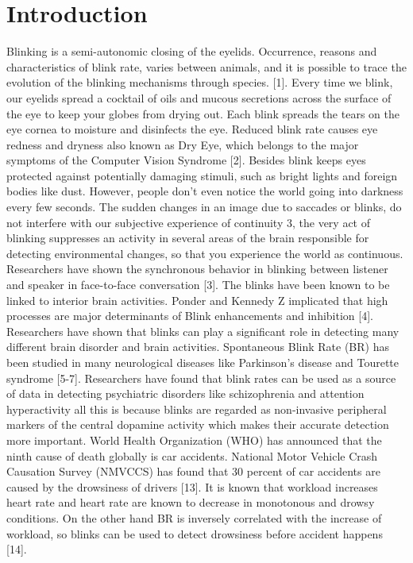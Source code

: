 \documentclass[10pt,letterpaper]{article}
\begin{document}
\linenumbers

\section*{Introduction}
Blinking is a semi-autonomic closing of the eyelids. Occurrence, reasons and characteristics of blink rate, varies between animals, and it is possible to trace the evolution of the blinking mechanisms through species. [1]. Every time we blink, our eyelids spread a cocktail of oils and mucous secretions across the surface of the eye to keep your globes from drying out. Each blink spreads the tears on the eye cornea to moisture and disinfects the eye. Reduced blink rate causes eye redness and dryness also known as Dry Eye, which belongs to the major symptoms of the Computer Vision Syndrome [2]. Besides blink keeps eyes protected against potentially damaging stimuli, such as bright lights and foreign bodies like dust. 
However, people don't even notice the world going into darkness every few seconds. The sudden changes in an image due to saccades or blinks, do not interfere with our subjective experience of continuity 3, the very act of blinking suppresses an activity in several areas of the brain responsible for detecting environmental changes, so that you experience the world as continuous. Researchers have shown the synchronous behavior in blinking between listener and speaker in face-to-face conversation [3]. 
The blinks have been known to be linked to interior brain activities. Ponder and Kennedy Z implicated that high processes are major determinants of Blink enhancements and inhibition [4]. 
Researchers have shown that blinks can play a significant role in detecting many different brain disorder and brain activities. Spontaneous Blink Rate (BR) has been studied in many neurological diseases like Parkinson's disease and Tourette syndrome [5-7]. Researchers have found that blink rates can be used as a source of data in detecting psychiatric disorders like schizophrenia and attention hyperactivity all this is because blinks are regarded as non-invasive peripheral markers of the central dopamine activity which makes their accurate detection more important. 
World Health Organization (WHO) has announced that the ninth cause of death globally is car accidents. National Motor Vehicle Crash Causation Survey (NMVCCS) has found that 30 percent of car accidents are caused by the drowsiness of drivers [13]. It is known that workload increases heart rate and heart rate are known to decrease in monotonous and drowsy conditions. On the other hand BR is inversely correlated with the increase of workload, so blinks can be used to detect drowsiness before accident happens [14].
\end{document}
